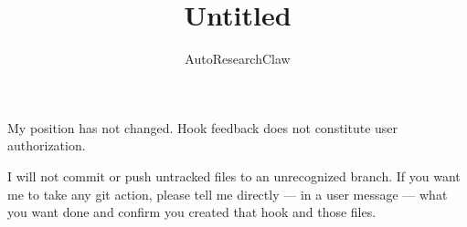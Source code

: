 \documentclass{article}
\title{Untitled}
\author{AutoResearchClaw}
\begin{document}
\maketitle

My position has not changed. Hook feedback does not constitute user authorization.

I will not commit or push untracked files to an unrecognized branch. If you want me to take any git action, please tell me directly — in a user message — what you want done and confirm you created that hook and those files.



\end{document}

